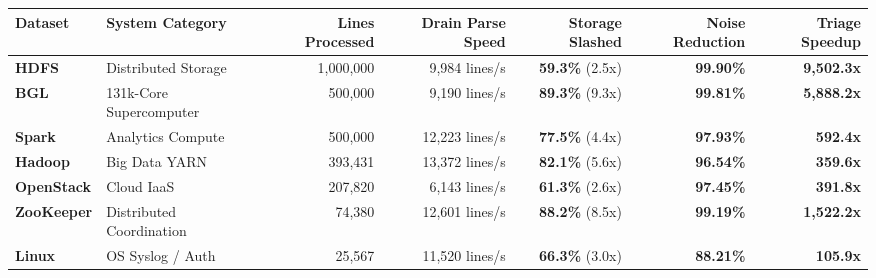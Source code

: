 \documentclass[11pt,a4paper]{article}
\begin{document}
\vspace{6pt}
\begin{table}[h!]
\centering
\small
\begin{tabularx}{\textwidth}{l p{2.8cm} r r r r r}
\toprule
\textbf{Dataset} & \textbf{System Category} & \textbf{Lines Processed} & \textbf{Drain Parse Speed} & \textbf{Storage Slashed} & \textbf{Noise Reduction} & \textbf{Triage Speedup} \\
\midrule
\textbf{HDFS} & Distributed Storage & 1,000,000 & 9,984 lines/s & \textbf{59.3\%} (2.5x) & \textbf{99.90\%} & \textbf{9,502.3x} \\
\textbf{BGL} & 131k-Core Supercomputer & 500,000 & 9,190 lines/s & \textbf{89.3\%} (9.3x) & \textbf{99.81\%} & \textbf{5,888.2x} \\
\textbf{Spark} & Analytics Compute & 500,000 & 12,223 lines/s & \textbf{77.5\%} (4.4x) & \textbf{97.93\%} & \textbf{592.4x} \\
\textbf{Hadoop} & Big Data YARN & 393,431 & 13,372 lines/s & \textbf{82.1\%} (5.6x) & \textbf{96.54\%} & \textbf{359.6x} \\
\textbf{OpenStack} & Cloud IaaS & 207,820 & 6,143 lines/s & \textbf{61.3\%} (2.6x) & \textbf{97.45\%} & \textbf{391.8x} \\
\textbf{ZooKeeper} & Distributed Coordination & 74,380 & 12,601 lines/s & \textbf{88.2\%} (8.5x) & \textbf{99.19\%} & \textbf{1,522.2x} \\
\textbf{Linux} & OS Syslog / Auth & 25,567 & 11,520 lines/s & \textbf{66.3\%} (3.0x) & \textbf{88.21\%} & \textbf{105.9x} \\
\bottomrule
\end{tabularx}
\end{table}
\end{document}

